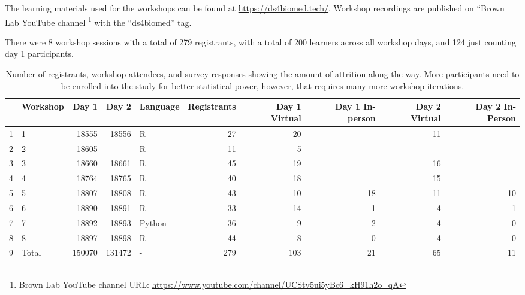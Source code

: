 \documentclass[030-workshop.tex]{subfiles}
\begin{document}
    The learning materials used for the workshops can be found at
    \url{https://ds4biomed.tech/}.
    Workshop recordings are published on ``Brown Lab YouTube channel
    \footnote{Brown Lab YouTube channel URL: \url{https://www.youtube.com/channel/UCStv5ui5yBc6_kH91h2o_qA}}
    with the ``ds4biomed'' tag.

    There were 8 workshop sessions with a total of 279 registrants,
    with a total of 200 learners across all workshop days,
    and 124 just counting day 1 participants.

    \begin{table}[ht]
        \centering
        \caption[Workshop Registration and Survey Counts]
            {Number of registrants, workshop attendees, and survey responses showing the amount of attrition along the way.
             More participants need to be enrolled into the study for better statistical power,
             however, that requires many more workshop iterations.
            }
        \begin{tabular}{rlrrlrrrrr}
            \hline
            & Workshop & Day 1 & Day 2 & Language & Registrants & Day 1 Virtual & Day 1 In-person & Day 2 Virtual & Day 2 In-Person \\
            \hline
            1 & 1 & 18555 & 18556 & R &  27 &  20 &  &  11 &  \\
            2 & 2 & 18605 &  & R &  11 &   5 &  &  &  \\
            3 & 3 & 18660 & 18661 & R &  45 &  19 &  &  16 &  \\
            4 & 4 & 18764 & 18765 & R &  40 &  18 &  &  15 &  \\
            5 & 5 & 18807 & 18808 & R &  43 &  10 &  18 &  11 &  10 \\
            6 & 6 & 18890 & 18891 & R &  33 &  14 &   1 &   4 &   1 \\
            7 & 7 & 18892 & 18893 & Python &  36 &   9 &   2 &   4 &   0 \\
            8 & 8 & 18897 & 18898 & R &  44 &   8 &   0 &   4 &   0 \\
            9 & Total & 150070 & 131472 & - & 279 & 103 &  21 &  65 &  11 \\
            \hline
        \end{tabular}
        \label{tab:workshop-counts}
    \end{table}
\end{document}
